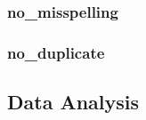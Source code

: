 \subsubsection{no\_misspelling}
\label{subs:no_misspelling}

\subsubsection{no\_duplicate}
\label{subs:no_duplicate}


\subsection{Data Analysis}
\label{sub:analysis}

%
%
%
%
%
%

